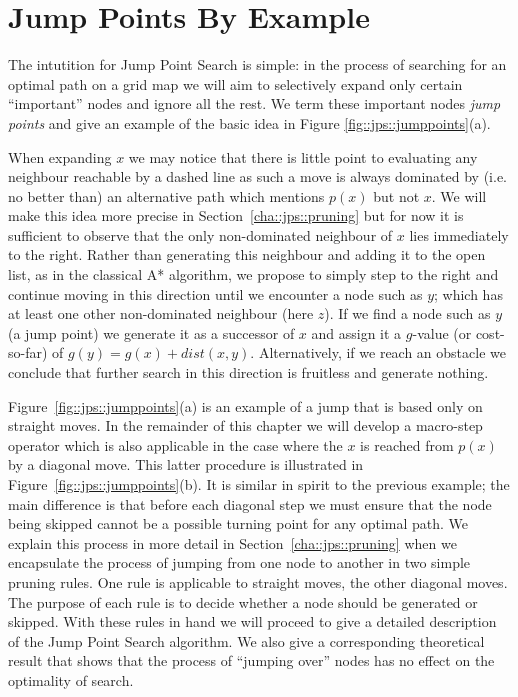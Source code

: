 \section{Jump Points By Example}
\label{cha::jps::jumppoints}
The intutition for Jump Point Search is simple: in the process of searching
for an optimal path on a grid map we will aim to selectively expand only
certain ``important'' nodes and ignore all the rest.
We term these important nodes \emph{jump points} and give an example of the 
basic idea in Figure \ref{fig::jps::jumppoints}(a).

When expanding $x$ we may notice that there is little point to evaluating any
neighbour reachable by a dashed line as such a move is always
dominated by (i.e. no better than) an alternative path which mentions 
$p(x)$ but not $x$.
We will make this idea more precise in Section~\ref{cha::jps::pruning} but for now it is 
sufficient to observe that the only non-dominated neighbour of $x$ 
lies immediately to the right.
Rather than generating this neighbour and adding it to the open list,
as in the classical A* algorithm, we propose 
to simply step to the right and continue moving in this direction until we
encounter a node such as $y$; which has at least one other non-dominated
neighbour (here $z$). 
If we find a node such as $y$ (a jump point) we generate it as a successor 
of $x$ and assign it a $g$-value (or cost-so-far) of $g(y) = g(x) + dist(x,
y)$.
Alternatively, if we reach an obstacle we conclude that further search in this
direction is fruitless and generate nothing.
\par
Figure~\ref{fig::jps::jumppoints}(a) is an example of a jump that is based
only on straight moves. In the remainder of this chapter we will develop  
a macro-step operator which is also applicable in the case where the $x$ is reached
from $p(x)$ by a diagonal move. This latter procedure is illustrated in 
Figure~\ref{fig::jps::jumppoints}(b). It is similar in spirit to the previous example;
the main difference is that before each diagonal step we must ensure that the node 
being skipped cannot be a possible turning point for any optimal path. 
We explain this process in more detail in Section~\ref{cha::jps::pruning} when we encapsulate
the process of jumping from one node to another in two simple pruning rules.
One rule is applicable to straight moves, the other diagonal moves.
The purpose of each rule is to decide whether a node should be generated or skipped. 
With these rules in hand we will proceed to give a detailed description of the Jump
Point Search algorithm. We also give a corresponding theoretical result that shows 
that the process of ``jumping over'' nodes has no effect on the optimality of search.

